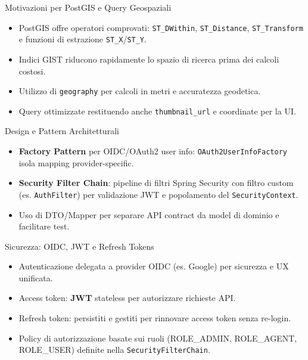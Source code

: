 \documentclass[10pt]{beamer}
\begin{document}
\begin{frame}{Motivazioni per PostGIS e Query Geospaziali}
    \begin{itemize}
        \item PostGIS offre operatori comprovati: \texttt{ST\_DWithin}, \texttt{ST\_Distance}, \texttt{ST\_Transform} e funzioni di estrazione \texttt{ST\_X}/\texttt{ST\_Y}.
        \item Indici GIST riducono rapidamente lo spazio di ricerca prima dei calcoli costosi.
        \item Utilizzo di \texttt{geography} per calcoli in metri e accuratezza geodetica.
        \item Query ottimizzate restituendo anche \texttt{thumbnail\_url} e coordinate per la UI.
    \end{itemize}
\end{frame}

\begin{frame}{Design e Pattern Architetturali}
    \begin{itemize}
        \item \textbf{Factory Pattern} per OIDC/OAuth2 user info: \texttt{OAuth2UserInfoFactory} isola mapping provider-specific.
        \item \textbf{Security Filter Chain}: pipeline di filtri Spring Security con filtro custom (es. \texttt{AuthFilter}) per validazione JWT e popolamento del \texttt{SecurityContext}.
        \item Uso di DTO/Mapper per separare API contract da model di dominio e facilitare test.
    \end{itemize}
\end{frame}

\begin{frame}{Sicurezza: OIDC, JWT e Refresh Tokens}
    \begin{itemize}
        \item Autenticazione delegata a provider OIDC (es. Google) per sicurezza e UX unificata.
        \item Access token: \textbf{JWT} stateless per autorizzare richieste API.
        \item Refresh token: persistiti e gestiti per rinnovare access token senza re-login.
        \item Policy di autorizzazione basate sui ruoli (ROLE\_ADMIN, ROLE\_AGENT, ROLE\_USER) definite nella \texttt{SecurityFilterChain}.
    \end{itemize}
\end{frame}
\end{document}
